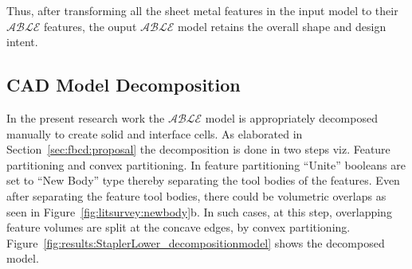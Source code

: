 
Thus, after transforming all the sheet metal features in the input model to their $\mathcal{ABLE}$ features, the ouput $\mathcal{ABLE}$ model retains the overall shape and design intent.

%

\subsection{CAD Model Decomposition}

In the present research work the $\mathcal{ABLE}$ model is appropriately decomposed manually to create solid and interface cells. As elaborated in Section~\ref{sec:fbcd:proposal} the decomposition is done in two steps viz. Feature partitioning and convex partitioning.  In feature partitioning ``Unite'' booleans are set to ``New Body'' type thereby separating the tool bodies of the features.  Even after separating the feature tool bodies, there could be volumetric overlaps as seen in Figure~\ref{fig:litsurvey:newbody}b. In such cases, at this step, overlapping feature volumes are split at the concave edges, by convex partitioning. Figure~\ref{fig:results:StaplerLower_decompositionmodel} shows the decomposed model.



